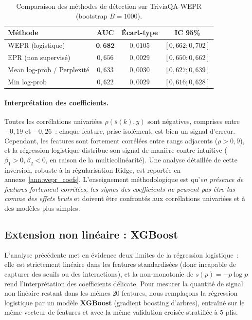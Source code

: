 \documentclass[12pt,a4paper]{article}
\begin{document}
\begin{table}[H]
\centering
\caption{Comparaison des méthodes de détection sur TriviaQA-WEPR (bootstrap $B=1000$).}
\label{tab:wepr_results}
\small
\begin{tabular}{lccc}
\toprule
Méthode & AUC & Écart-type & IC 95\% \\
\midrule
WEPR (logistique) & $\mathbf{0{,}682}$ & $0{,}0105$ & $[0{,}662; 0{,}702]$ \\
EPR (non supervisé) & $0{,}656$ & $0{,}0029$ & $[0{,}650; 0{,}662]$ \\
Mean log-prob / Perplexité & $0{,}633$ & $0{,}0030$ & $[0{,}627; 0{,}639]$ \\
Min log-prob & $0{,}622$ & $0{,}0029$ & $[0{,}616; 0{,}628]$ \\
\bottomrule
\end{tabular}
\end{table}

\paragraph{Interprétation des coefficients.}
Toutes les corrélations univariées $\rho(\overline{s}(k), y)$ sont négatives, comprises entre $-0{,}19$ et $-0{,}26$~: chaque feature, prise isolément, est bien un signal d'erreur. Cependant, les features sont fortement corrélées entre rangs adjacents ($\rho > 0{,}9$), et la régression logistique distribue son signal de manière contre-intuitive ($\beta_1 > 0, \beta_2 < 0$, en raison de la multicolinéarité). Une analyse détaillée de cette inversion, robuste à la régularisation Ridge, est reportée en annexe~\ref{ann:wepr_coefs}. L'enseignement méthodologique est qu'\emph{en présence de features fortement corrélées, les signes des coefficients ne peuvent pas être lus comme des effets bruts} et doivent être confrontés aux corrélations univariées et à des modèles plus simples.

\subsection{Extension non linéaire : XGBoost}

L'analyse précédente met en évidence deux limites de la régression logistique~: elle est strictement linéaire dans les features standardisées (donc incapable de capturer des seuils ou des interactions), et la non-monotonie de $s(p) = -p\log p$ rend l'interprétation des coefficients délicate. Pour mesurer la quantité de signal non linéaire restant dans les mêmes 20 features, nous remplaçons la régression logistique par un modèle \textbf{XGBoost} (gradient boosting d'arbres), entraîné sur le même vecteur de features et avec la même validation croisée stratifiée à 5 plis.
\end{document}
